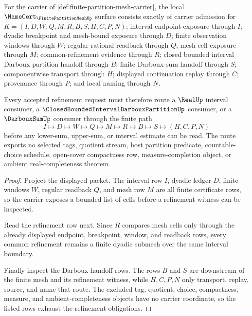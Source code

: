 \begin{theorem}
\label{thm:finite-partition-mesh-refinement-obligations}
For the carrier of \autoref{def:finite-partition-mesh-carrier}, the local $\NameCert_{\FinitePartitionMeshUp}$ surface consists exactly of carrier admission for $K=(I,D,W,Q,M,R,B,S,H,C,P,N)$; interval endpoint exposure through $I$; dyadic breakpoint and mesh-bound exposure through $D$; finite observation windows through $W$; regular rational readback through $Q$; mesh-cell exposure through $M$; common-refinement evidence through $R$; closed bounded interval Darboux partition handoff through $B$; finite Darboux-sum handoff through $S$; componentwise transport through $H$; displayed continuation replay through $C$; provenance through $P$; and local naming through $N$.

Every accepted refinement request must therefore route a $\RealUp$ interval consumer, a $\ClosedBoundedIntervalDarbouxPartitionUp$ consumer, or a $\DarbouxSumUp$ consumer through the finite path
$$
I\longmapsto D\longmapsto W\longmapsto Q\longmapsto M\longmapsto R\longmapsto B\longmapsto S\longmapsto(H,C,P,N)
$$
before any lower-sum, upper-sum, or interval estimate can be read. The route exports no selected tags, quotient stream, host partition predicate, countable-choice schedule, open-cover compactness row, measure-completion object, or ambient real-completeness theorem.
\end{theorem}
\begin{proof}
Project the displayed packet. The interval row $I$, dyadic ledger $D$, finite windows $W$, regular readback $Q$, and mesh row $M$ are all finite certificate rows, so the carrier exposes a bounded list of cells before a refinement witness can be inspected.

Read the refinement row next. Since $R$ compares mesh cells only through the already displayed endpoint, breakpoint, window, and readback rows, every common refinement remains a finite dyadic submesh over the same interval boundary.

Finally inspect the Darboux handoff rows. The rows $B$ and $S$ are downstream of the finite mesh and its refinement witness, while $H,C,P,N$ only transport, replay, source, and name that route. The excluded tag, quotient, choice, compactness, measure, and ambient-completeness objects have no carrier coordinate, so the listed rows exhaust the refinement obligations.
\end{proof}



